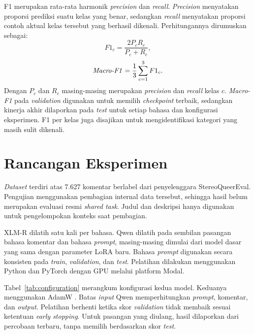 \documentclass[11pt]{article}
\begin{document}
F1 merupakan rata-rata harmonik \textit{precision} dan \textit{recall}. \textit{Precision} menyatakan proporsi prediksi suatu kelas yang benar, sedangkan \textit{recall} menyatakan proporsi contoh aktual kelas tersebut yang berhasil dikenali. Perhitungannya dirumuskan sebagai:
\begin{equation}
F1_c = \frac{2P_cR_c}{P_c+R_c},
\end{equation}
\begin{equation}
\text{\textit{Macro-F1}} = \frac{1}{3}\sum_{c=1}^{3}F1_c.
\end{equation}
Dengan $P_c$ dan $R_c$ masing-masing merupakan \textit{precision} dan \textit{recall} kelas $c$. \textit{Macro-F1} pada \textit{validation} digunakan untuk memilih \textit{checkpoint} terbaik, sedangkan kinerja akhir dilaporkan pada \textit{test} untuk setiap bahasa dan konfigurasi eksperimen. F1 per kelas juga disajikan untuk mengidentifikasi kategori yang masih sulit dikenali.

\section{Rancangan Eksperimen}
\textit{Dataset} terdiri atas 7.627 komentar berlabel dari penyelenggara StereoQueerEval. Pengujian menggunakan pembagian internal data tersebut, sehingga hasil belum merupakan evaluasi resmi \textit{shared task}. Judul dan deskripsi hanya digunakan untuk pengelompokan konteks saat pembagian.

XLM-R dilatih satu kali per bahasa. Qwen dilatih pada sembilan pasangan bahasa komentar dan bahasa \textit{prompt}, masing-masing dimulai dari model dasar yang sama dengan parameter LoRA baru. Bahasa \textit{prompt} digunakan secara konsisten pada \textit{train}, \textit{validation}, dan \textit{test}. Pelatihan dilakukan menggunakan Python dan PyTorch dengan GPU melalui platform Modal.

Tabel~\ref{tab:configuration} merangkum konfigurasi kedua model. Keduanya menggunakan AdamW \citep{loshchilov-hutter-2019-decoupled}. Batas \textit{input} Qwen memperhitungkan \textit{prompt}, komentar, dan \textit{output}. Pelatihan berhenti ketika skor \textit{validation} tidak membaik sesuai ketentuan \textit{early stopping}. Untuk pasangan yang diulang, hasil dilaporkan dari percobaan terbaru, tanpa memilih berdasarkan skor \textit{test}.
\end{document}
